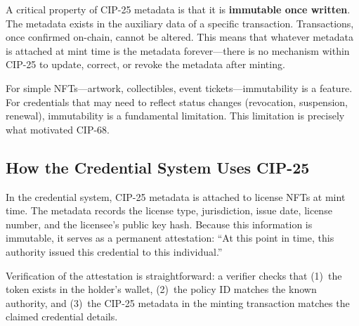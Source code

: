 A critical property of CIP-25 metadata is that it is \textbf{immutable once
written}.  The metadata exists in the auxiliary data of a specific
transaction.  Transactions, once confirmed on-chain, cannot be altered.  This
means that whatever metadata is attached at mint time is the metadata
forever---there is no mechanism within CIP-25 to update, correct, or revoke
the metadata after minting.

For simple NFTs---artwork, collectibles, event tickets---immutability is a
feature.  For credentials that may need to reflect status changes
(revocation, suspension, renewal), immutability is a fundamental limitation.
This limitation is precisely what motivated CIP-68.

\subsection{How the Credential System Uses CIP-25}

In the credential system, CIP-25 metadata is attached to license NFTs at
mint time.  The metadata records the license type, jurisdiction, issue date,
license number, and the licensee's public key hash.  Because this
information is immutable, it serves as a permanent attestation: ``At this
point in time, this authority issued this credential to this individual.''

Verification of the attestation is straightforward: a verifier checks that
(1)~the token exists in the holder's wallet, (2)~the policy ID matches the
known authority, and (3)~the CIP-25 metadata in the minting transaction
matches the claimed credential details.

